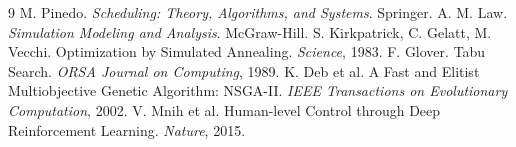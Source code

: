 \documentclass[UTF8,zihao=-4,openany]{ctexrep}
\begin{document}
\begin{thebibliography}{9}
 M. Pinedo. \textit{Scheduling: Theory, Algorithms, and Systems}. Springer.
 A. M. Law. \textit{Simulation Modeling and Analysis}. McGraw-Hill.
 S. Kirkpatrick, C. Gelatt, M. Vecchi. Optimization by Simulated Annealing. \textit{Science}, 1983.
 F. Glover. Tabu Search. \textit{ORSA Journal on Computing}, 1989.
 K. Deb et al. A Fast and Elitist Multiobjective Genetic Algorithm: NSGA-II. \textit{IEEE Transactions on Evolutionary Computation}, 2002.
 V. Mnih et al. Human-level Control through Deep Reinforcement Learning. \textit{Nature}, 2015.
\end{thebibliography}
\end{document}
